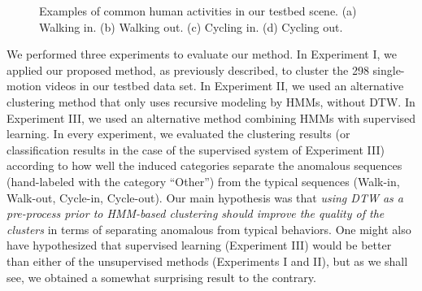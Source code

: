 \begin{figure}[t]
  \centering
  \hspace{0.05in}
  \hspace{0.05in}
  \hspace{0.05in}
  \caption[Examples of common human activities in our testbed
    scene.]{\small Examples of common human activities in our testbed
    scene.  (a) Walking in. (b) Walking out.  (c) Cycling in. (d)
    Cycling out.}
  \label{fig:example-behavior}
\end{figure}

We performed three experiments to evaluate our method. In Experiment
I, we applied our proposed method, as previously described, to cluster
the 298 single-motion videos in our testbed data set. In Experiment
II, we used an alternative clustering method that only uses recursive
modeling by HMMs, without DTW. In Experiment III, we used an
alternative method combining HMMs with supervised learning. In every
experiment, we evaluated the clustering results (or classification
results in the case of the supervised system of Experiment III)
according to how well the induced categories separate the anomalous
sequences (hand-labeled with the category ``Other'') from the typical
sequences (Walk-in, Walk-out, Cycle-in, Cycle-out). Our main
hypothesis was that \textit{using DTW as a pre-process prior to
HMM-based clustering should improve the quality of the clusters} in
terms of separating anomalous from typical behaviors. One might also
have hypothesized that supervised learning (Experiment III) would be
better than either of the unsupervised methods (Experiments I and II),
but as we shall see, we obtained a somewhat surprising result to the
contrary.

